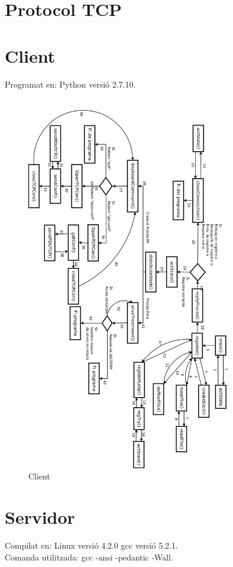 \documentclass[11pt]{article}
\begin{document}
\section{Protocol TCP}
\section{Client}
\justify
Programat en: Python versió 2.7.10.
\\\\
\begin{figure}[h]
    \includegraphics[width=0.8\textwidth]{Client.png}
    \caption{Client}
    \label{fig:Client}
\end{figure}
\newpage
\section{Servidor}
Compilat en: Linux versió 4.2.0 gcc versió 5.2.1.\\
Comanda utilitzada: gcc -ansi -pedantic -Wall.
\newpage
\end{document}
